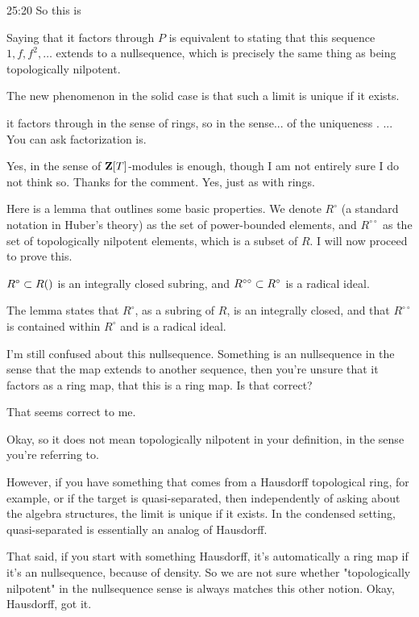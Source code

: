 \begin{unfinished}{25:20}
So this is

Saying that it factors through $P$ is equivalent to stating that this sequence $1, f , f^2, \ldots$ extends to a nullsequence, which is precisely the same thing as being topologically nilpotent. 

The new phenomenon in the solid case is that such a limit is unique if it exists. 

%

\gabber it factors through in the sense of rings, so in the sense... of the uniqueness .  ... You can ask factorization is.

\answer Yes, in the sense of $\mathbf Z[T]$-modules is enough, though I am not entirely sure I do not think so. Thanks for the comment. Yes, just as with rings.

Here is a lemma that outlines some basic properties. We denote $R^\circ$ (a standard notation in Huber's theory) as the set of power-bounded elements, and $R^{\circ \circ}$ as the set of topologically nilpotent elements, which is a subset of $R$. I will now proceed to prove this.

\bl
$R^\circ \subset R()$ is an integrally closed subring, and $R^{\circ \circ} \subset R^\circ$ is a radical ideal.
\el

%
The lemma states that $R^\circ$, as a subring of $R$, is an integrally closed, and that $R^{\circ \circ}$ is contained within $R^\circ$ and is a radical ideal.

%
\ques I'm still confused about this nullsequence. Something is an nullsequence in the sense that the map extends to another sequence, then you're unsure that it factors as a ring map, that this is a ring map. Is that correct?

\ans That seems correct to me. 

Okay, so it does not mean topologically nilpotent in your definition, in the sense you're referring to.

However, if you have something that comes from a Hausdorff topological ring, for example, or if the target is quasi-separated, then independently of asking about the algebra structures, the limit is unique if it exists. 
In the condensed setting, quasi-separated is essentially an analog of Hausdorff.

%
That said, if you start with something Hausdorff, it's automatically a ring map if it's an nullsequence, because of density. 
So we are not sure whether "topologically nilpotent" in the nullsequence sense is always matches this other notion. 
Okay, Hausdorff, got it.


\end{unfinished}
